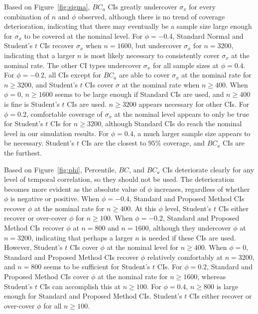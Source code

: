 \documentclass[12pt, letterpaper, titlepage]{article}
\begin{document}
Based on Figure~\ref{fig:sigma}, 
$BC_a$ CIs greatly undercover $\sigma_x$ for every combination of $n$ and 
$\phi$ observed, although there is no trend of coverage deterioration, 
indicating that there may eventually
be a sample size large enough for $\sigma_x$ to be covered at the nominal level.
For $\phi = -0.4$, Standard Normal and Student's $t$ CIs recover $\sigma_x$ when 
$n = 1600$, but undercover $\sigma_x$ for $n = 3200$, indicating
that a larger $n$ is most likely necessary to consistently cover $\sigma_x$ at 
the nominal rate.
The other CI types undercover $\sigma_x$ for all sample sizes at $\phi = 0.4$.
For $\phi  = -0.2$, all CIs except for $BC_a$ are able to cover $\sigma_x$ at 
the nominal rate for $n \geq 3200$, and Student's $t$ CIs cover $\sigma$ at the 
nominal rate when $n \geq 400$. When $\phi = 0$, $n \geq 1600$ seems to 
be large enough if Standard CIs are used, and $n \geq 400$ is fine is
Student's $t$ CIs are used. $n \geq 3200$ appears necessary 
for other CIs. For $\phi = 0.2$, 
comfortable coverage of $\sigma_x$ at the nominal level appears to only be true
for Student's $t$ CIs for $n \geq 3200$, although Standard %
CIs do reach the nominal level in our simulation results. For $\phi = 0.4$, a much
larger sample size appears to be necessary. Student's $t$ CIs are the closest to
$95\%$ coverage, and $BC_a$ CIs are the furthest.

Based on Figure~\ref{fig:phi}, 
Percentile, %
$BC$, and $BC_a$ CIs deteriorate clearly for any level of temporal correlation,
so they should not be used. The deterioration becomes more evident
as the absolute value of $\phi$ increases, regardless of whether $\phi$ is 
negative or positive. When $\phi = -0.4$, Standard and Proposed Method CIs 
recover $\phi$ at the nominal rate for $n \geq 400$. At this $\phi$ level,
Student's $t$ CIs either recover or over-cover $\phi$ for $n \geq 100$. When
$\phi = -0.2$, Standard and Proposed Method CIs recover $\phi$ at $n = 800$ and 
$n = 1600$, 
although they undercover $\phi$ at $n = 3200$, indicating that 
perhaps a larger $n$ is needed if these CIs are used. However,
Student's $t$ CIs cover $\phi$ at the nominal level for $n \geq 400$. When
$\phi = 0$, Standard and Proposed Method CIs recover $\phi$ relatively 
comfortably at $n = 3200$, and 
$n = 800$ seems to be sufficient for Student's $t$ CIs. For $\phi = 0.2$, Standard
and Proposed Method CIs cover $\phi$ at the nominal rate for $n \geq 1600$, whereas 
Student's $t$ CIs can accomplish this at $n \geq 100$. For $\phi = 0.4$, $n \geq 
800$ is large enough for Standard and Proposed Method CIs. Student's $t$ CIs either
recover or over-cover $\phi$ for all $n \geq 100$.
\end{document}
